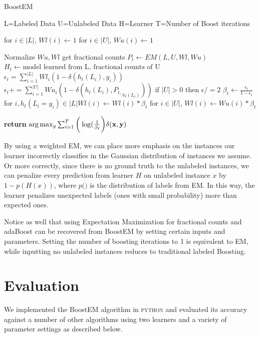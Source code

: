 \documentclass{sig-alternate}
\begin{document}
\begin{algorithm}
\caption{BoostEM}\label{euclid}
\begin{algorithmic}[1]
\State L=Labeled Data
\State U=Unlabeled Data
\State H=Learner
\State T=Number of Boost iterations

\State for $i \in |L|$, $ Wl(i) \gets 1$
\State for $i \in |U|$, $ Wu(i) \gets 1$

\State Normalize $Wu,Wl$
\State get fractional counts $P_{t} \gets EM(L,U,Wl,Wu)$
\State $H_{t} \gets \text{model learned from L, fractional counts of U}$
\State $\epsilon_{t} = \sum_{i=1}^{|L|} Wl_{i}(1-\delta(h_{t}(L_{i}),y_{i}))$
\State $\epsilon_{t} += \sum_{i=1}^{|U|} Wu_{i}(1-\delta(h_{t}(L_{i}),{P_{t,}}_{h_{t}(L_{i})}))$
\State if $|U| > 0$ then $\epsilon /= 2$
\State $\beta_{t} \gets \frac{\epsilon_{t}}{1-\epsilon_{t}}$
\State for $i,h_{t}(L_{i} = y_{i}) \in |L| Wl(i) \gets Wl(i)*\beta_{t}$
\State for $i \in |U|$, $Wl(i) \gets Wu(i)*\beta_{t}$

\EndFor
\State \textbf{return} $\arg \max_{y} \sum_{i=1}^{T}\bigg(\log(\frac{1}{\beta_{t}}\bigg) \delta(\bf{x},y)$
\EndProcedure
\end{algorithmic}
\end{algorithm}

By using a weighted EM, we can place more emphasis on the instances our learner incorrectly classifies in the Gaussian distribution of instances we assume. Or more correctly, since there is no ground truth to the unlabeled instances, we can penalize every prediction from learner $H$ on unlabeled instance $x$ by $1-p(H(x))$, where $p(\dot)$ is the distribution of labels from EM.  In this way, the learner penalizes unexpected labels (ones with small probability) more than expected ones.

Notice as well that using Expectation Maximization for fractional counts and adaBoost can be recovered from BoostEM by setting certain inputs and parameters.  Setting the number of boosting iterations to 1 is equivalent to EM, while inputting no unlabeled instances reduces to traditional labeled Boosting.    
    
\section{Evaluation}
We implemented the BoostEM algorithm in \textsc{python} and evaluated its accuracy against a number of other algorithms using two learners and a variety of parameter settings  as described below.
\end{document}
